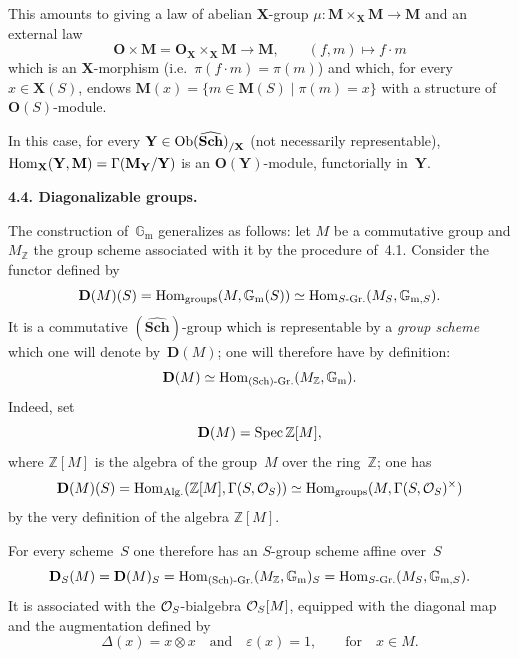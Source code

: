 This amounts to giving a law of abelian \(\mathbf{X}\)-group \(\mu \colon \mathbf{M} \times_{\mathbf{X}} \mathbf{M} \to \mathbf{M}\) and an \og external law\fg{}
\[
\mathbf{O} \times \mathbf{M} = \mathbf{O}_{\mathbf{X}} \times_{\mathbf{X}} \mathbf{M} \longrightarrow \mathbf{M}, \qquad (f, m) \mapsto f \cdot m
\]
which is an \(\mathbf{X}\)-morphism (i.e.\ \(\pi(f \cdot m) = \pi(m)\)) and which, for every \(x \in \mathbf{X}(S)\), endows \(\mathbf{M}(x) = \{m \in \mathbf{M}(S) \mid \pi(m) = x\}\) with a structure of \(\mathbf{O}(S)\)-module.

In this case, for every \(\mathbf{Y} \in {\operatorname{Ob}(\widehat{\mathbf{Sch}})}_{/\mathbf{X}}\) (not necessarily representable), \(\operatorname{Hom}_{\mathbf{X}}(\mathbf{Y}, \mathbf{M}) = \Gamma(\mathbf{M}_{\mathbf{Y}}/\mathbf{Y})\) is an \(\mathbf{O}(\mathbf{Y})\)-module, functorially in~\(\mathbf{Y}\).
\par{}

\par{}
\noindent\textbf{4.4. Diagonalizable groups.}\label{I.sec.4.4}

The construction of~\(\mathbb{G}_{\mathrm{m}}\) generalizes as follows: let \(M\) be a commutative group and \(M_{\mathbb{Z}}\) the group scheme associated with it by the procedure of~4.1. Consider the functor defined by
\[
\mathbf{D}(M)(S) = \operatorname{Hom}_{\mathrm{groups}}(M, \mathbb{G}_{\mathrm{m}}(S)) \simeq \operatorname{Hom}_{S\text{-Gr.}}(M_S, \mathbb{G}_{\mathrm{m},S}).
\]
It is a commutative \((\widehat{\mathbf{Sch}})\)-group which is representable by a \emph{group scheme} which one will denote by~\(\mathbf{D}(M)\); one will therefore have by definition:
\[
\mathbf{D}(M) \simeq \operatorname{Hom}_{(\mathrm{Sch})\text{-Gr.}}(M_{\mathbb{Z}}, \mathbb{G}_{\mathrm{m}}).
\]
Indeed, set
\[
\mathbf{D}(M) = \operatorname{Spec} \mathbb{Z}[M],
\]
where \(\mathbb{Z}[M]\) is the algebra of the group~\(M\) over the ring~\(\mathbb{Z}\); one has
\[
\mathbf{D}(M)(S) = \operatorname{Hom}_{\mathrm{Alg.}}(\mathbb{Z}[M], \Gamma(S, \mathcal{O}_S)) \simeq \operatorname{Hom}_{\mathrm{groups}}(M, \Gamma(S, \mathcal{O}_S)^{\times})
\]
by the very definition of the algebra \(\mathbb{Z}[M]\).

For every scheme~\(S\) one therefore has an \(S\)-group scheme affine over~\(S\)
\[
\mathbf{D}_S(M) = \mathbf{D}(M)_S = \operatorname{Hom}_{(\mathrm{Sch})\text{-Gr.}}(M_{\mathbb{Z}}, \mathbb{G}_{\mathrm{m}})_S = \operatorname{Hom}_{S\text{-Gr.}}(M_S, \mathbb{G}_{\mathrm{m},S}).
\]
It is associated with the \(\mathcal{O}_S\)-bialgebra \(\mathcal{O}_S[M]\), equipped with the diagonal map and the augmentation defined by
\[
\Delta(x) = x \otimes x \quad\text{and}\quad \varepsilon(x) = 1, \qquad\text{for}\quad x \in M.
\]

